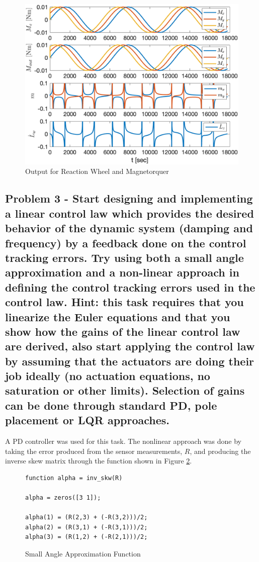 \begin{figure}[H]
    \centering
    \captionsetup{ justification = centering }
    \includegraphics[width = 15cm]{Images/PS9/simple_magnetorquer_plus_wheel_model_output.png}
    \caption{Output for Reaction Wheel and Magnetorquer}
    \label{fig:mtOutput}
\end{figure}

\subsection{Problem 3 - Start designing and implementing a linear control law which provides the desired behavior of the dynamic system (damping and frequency) by a feedback done on the control tracking errors. Try using both a small angle approximation and a non-linear approach in defining the control tracking errors used in the control law. Hint: this task requires that you linearize the Euler equations and that you show how the gains of the linear control law are derived, also start applying the control law by assuming that the actuators are doing their job ideally (no actuation equations, no saturation or other limits). Selection of gains can be done through standard PD, pole placement or LQR approaches.}

A PD controller was used for this task. The nonlinear approach was done by taking the error produced from the sensor measurements, $R$, and producing the inverse skew matrix through the function shown in Figure \ref{fig:smallThetaCode}.

\begin{figure}[H]
    \centering
    \captionsetup{ justification = centering}
    \begin{lstlisting}
function alpha = inv_skw(R)

alpha = zeros([3 1]);

alpha(1) = (R(2,3) + (-R(3,2)))/2;
alpha(2) = (R(3,1) + (-R(3,1)))/2;
alpha(3) = (R(1,2) + (-R(2,1)))/2;
    \end{lstlisting}
    \caption{Small Angle Approximation Function}
    \label{fig:smallThetaCode}
\end{figure}

